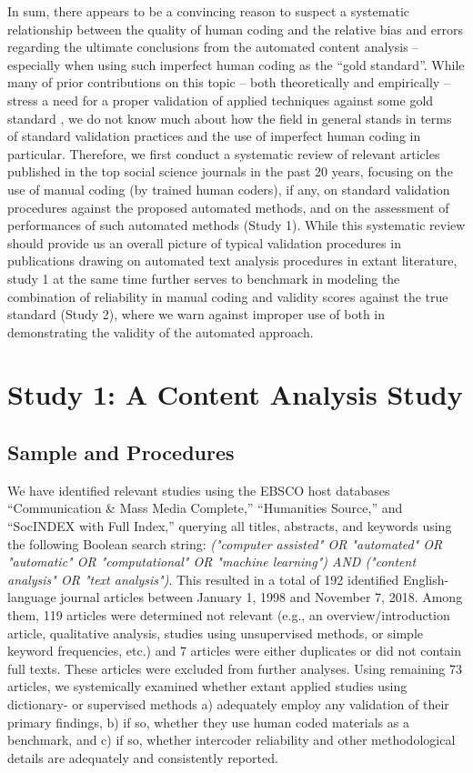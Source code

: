 \documentclass[man, 12pt, a4paper, nolmodern, noextraspace]{apa6}
\begin{document}
    In sum, there appears to be a convincing reason to suspect a systematic relationship between the quality of human coding and the relative bias and errors regarding the ultimate conclusions from the automated content analysis -- especially when using such imperfect human coding as the ``gold standard''. While many of prior contributions on this topic -- both theoretically and empirically -- stress a need for a proper validation of applied techniques against some gold standard \parencites[e.g.,][]{grimmer2013text, Hopkins_King2010, gonzalez2015signals}, we do not know much about how the field in general stands in terms of standard validation practices and the use of imperfect human coding in particular. Therefore, we first conduct a systematic review of relevant articles published in the top social science journals in the past 20 years, focusing on the use of manual coding (by trained human coders), if any, on standard validation procedures against the proposed automated methods, and on the assessment of performances of such automated methods (Study 1). While this systematic review should provide us an overall picture of typical validation procedures in publications drawing on automated text analysis procedures in extant literature, study 1 at the same time further serves to benchmark in modeling the combination of reliability in manual coding and validity scores against the true standard (Study 2), where we warn against improper use of both in demonstrating the validity of the automated approach.

\section{Study 1: A Content Analysis Study}

\subsection{Sample and Procedures}

    We have identified relevant studies using the EBSCO host databases “Communication \& Mass Media Complete,” “Humanities Source,” and “SocINDEX with Full Index,” querying all titles, abstracts, and keywords using the following Boolean search string: \textit{("computer assisted" OR "automated" OR "automatic" OR "computational" OR "machine learning") AND ("content analysis" OR "text analysis")}. This resulted in a total of 192 identified English-language journal articles between January 1, 1998 and November 7, 2018. Among them, 119 articles were determined not relevant (e.g., an overview/introduction article, qualitative analysis, studies using unsupervised methods, or simple keyword frequencies, etc.) and 7 articles were either duplicates or did not contain full texts. These articles were excluded from further analyses. Using remaining 73 articles, we systemically examined whether extant applied studies using dictionary- or supervised methods a) adequately employ any validation of their primary findings, b) if so, whether they use human coded materials as a benchmark, and c) if so, whether intercoder reliability and other methodological details are adequately and consistently reported. 
    
\end{document}
